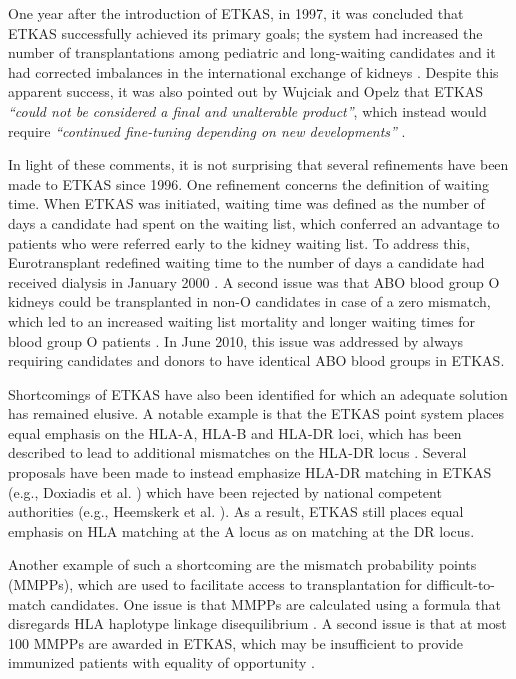 \documentclass[11pt,twoside,]{book}
\begin{document}
One year after the introduction of ETKAS, in 1997, it was concluded that ETKAS
successfully achieved its primary goals; the system had increased the number of transplantations
among pediatric and long-waiting candidates and it had corrected imbalances in
the international exchange of kidneys \citep{demeesterNewEurotransplantKidney1998, Persijn2006}.
Despite this apparent success, it was also pointed out by Wujciak and Opelz that
ETKAS \emph{``could not be considered a final and unalterable product''}, which instead
would require \emph{``continued fine-tuning depending on new developments''} \citep{Opelz1998}.

In light of these comments, it is not surprising that several refinements have
been made to ETKAS since 1996. One refinement concerns the definition of
waiting time. When ETKAS was initiated, waiting time was defined as the number of days
a candidate had spent on the waiting list, which conferred an advantage to patients
who were referred early to the kidney waiting list. To address this, Eurotransplant
redefined waiting time to the number of days a candidate had received dialysis
in January 2000 \citep{DeMeester2000}. A second issue was that ABO
blood group O kidneys could be transplanted in non-O candidates in case of
a zero mismatch, which led to an increased waiting list mortality and longer
waiting times for blood group O patients \citep{glander2010}. In June 2010, this
issue was addressed by always requiring candidates and donors to have identical
ABO blood groups in ETKAS.

Shortcomings of ETKAS have also been identified for which an adequate solution
has remained elusive. A notable example is that the ETKAS point system places
equal emphasis on the HLA-A, HLA-B and HLA-DR loci, which has been described to lead to
additional mismatches on the HLA-DR locus
\citep{demeesterNewEurotransplantKidney1998, vereerstraetenExperienceWujciakOpelzAllocation1998}.
Several proposals have
been made to instead emphasize HLA-DR matching in ETKAS (e.g., Doxiadis et al. \citep{doxiadisSimplerEquitableAllocation2007})
which have been rejected by national competent authorities (e.g., Heemskerk et al. \citep{heemskerkRegionalKidneyAllocation2009}).
As a result, ETKAS still places equal emphasis on HLA matching at the A locus
as on matching at the DR locus.

Another example of such a shortcoming are the mismatch
probability points (MMPPs), which are used to facilitate access to transplantation for
difficult-to-match candidates. One issue is that MMPPs are calculated using a
formula that disregards HLA haplotype linkage disequilibrium \citep{Wujciak1997}.
A second issue is that at most 100 MMPPs are awarded in ETKAS, which may be
insufficient to provide immunized patients with equality of opportunity
\citep{susal2015, ziemannUnacceptableHumanLeucocyte2017, zecherImpactSensitizationWaiting2022a}.
\end{document}
